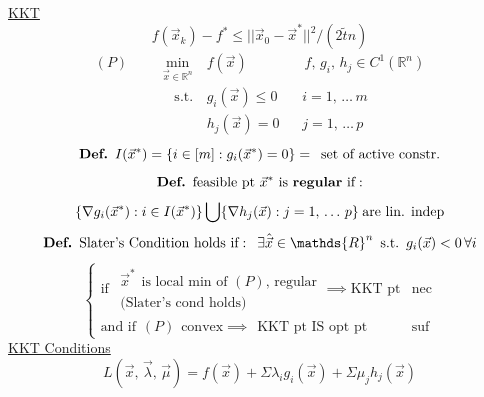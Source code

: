 \documentclass[twocolumn,12pt]{article}    %
\newcommand\Def{\text{\textbf{Def.}} \hspace{5pt}}
\newcommand \rn {\mathds{R}^n}
\newcommand \hfive {\hspace{5pt}}
\begin{document}
\noindent\underline{KKT}
\begin{equation*}
    f(\vec{x}_k) - f^* \leq ||\vec{x}_0 -\vec{x}^*||^2 /(2\tilde{t} n)
\end{equation*}
\begin{align*}
    (P)\hspace{20pt} &\min_{\vec{x} \in \rn} &\,f(\vec{x}) \hspace{30pt} & \, f,\, g_i,\, h_j  \in C^1(\rn)\\
    & \hspace{10pt} \text{s.t.} &\, g_i(\vec{x}) \leq 0 \hspace{10pt} &  i = 1,\, \dots\, m\\
    & &\, h_j(\vec{x}) = 0 \hspace{10pt} & j = 1,\, \dots \, p
\end{align*}
\begin{equation*}
    \Def I(\vec{x}^*) = \{i\in [m] : g_i(\vec{x}^*) =0  \} = \hfive \text{set of active constr.}
\end{equation*}
\begin{equation*}
    \Def \text{feasible pt } \vec{x}^* \text{ is \textbf{regular} if}: 
\end{equation*}
\begin{equation*}
    \{\nabla g_i(\vec{x}^*): i \in I(\vec{x}^*)\} \bigcup \{\nabla h_j(\vec{x}) : j = 1,\, \dots\, p \} \hspace{2.5pt} \text{are lin. indep}
\end{equation*}
\begin{equation*}
    \Def \text{Slater's Condition holds if}: \hfive \exists \hat{\vec{x}} \in \rn \hfive \text{s.t.} \hfive g_i(\vec{x}) < 0 \, \forall i
\end{equation*}
\begin{equation*}
    \begin{cases}
        \text{if} \hfive \begin{matrix}
            \vec{x}^* \hfive \text{is local min of } (P)\text{, regular} \\
            \text{(Slater's cond holds)}
        \end{matrix}\implies \text{KKT pt} & \text{nec}\\
        \text{and if} \hfive (P) \hfive \text{convex} \implies \hfive \text{KKT pt IS opt pt} & \text{suf}
    \end{cases}
\end{equation*}
\noindent \underline{KKT Conditions}
\begin{equation*}
    L(\vec{x},\, \vec{\lambda},\, \vec{\mu}) = f(\vec{x})  + \Sigma \lambda_i g_i(\vec{x}) + \Sigma \mu_j h_j(\vec{x})
\end{equation*}
\end{document}
